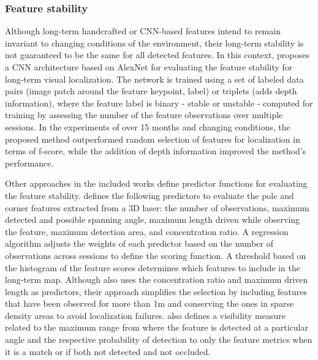\subsubsection{Feature stability}

Although long-term handcrafted or CNN-based features intend to remain invariant to changing conditions of the environment, their long-term stability is not guaranteed to be the same for all detected features. In this context, \cite{dymczyk-et-al:2016:66} proposes a CNN architecture based on AlexNet for evaluating the feature stability for long-term visual localization. The network is trained using a set of labeled data pairs (image patch around the feature keypoint, label) or triplets (adds depth information), where the feature label is binary - stable or unstable - computed for training by assessing the number of the feature observations over multiple sessions. In the experiments of over 15 months and changing conditions, the proposed method outperformed random selection of features for localization in terms of f-score, while the addition of depth information improved the method's performance.

Other approaches in the included works define predictor functions for evaluating the feature stability.
\cite{berrio-et-al:2019:8814289} defines the following predictors to evaluate the pole and corner features extracted from a 3D laser: the number of observations, maximum detected and possible spanning angle, maximum length driven while observing the feature, maximum detection area, and concentration ratio. A regression algorithm adjusts the weights of each predictor based on the number of observations across sessions to define the scoring function. A threshold based on the histogram of the feature scores determines which features to include in the long-term map.
Although \cite{berrio-et-al:2021:3094485} also uses the concentration ratio and maximum driven length as predictors, their approach simplifies the selection by including features that have been observed for more than 1m and conserving the ones in sparse density areas to avoid localization failures. \cite{berrio-et-al:2021:3094485} also defines a visibility measure related to the maximum range from where the feature is detected at a particular angle and the respective probability of detection to only the feature metrics when it is a match or if both not detected and not occluded.

